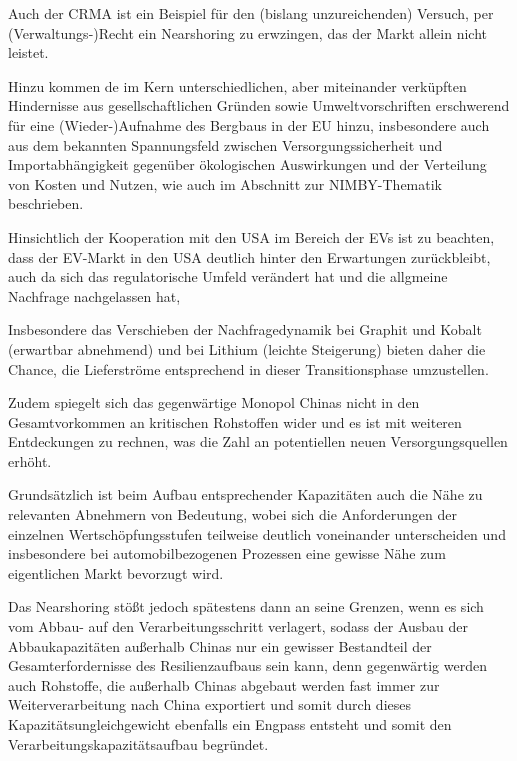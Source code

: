 \documentclass[12pt,a4paper,oneside]{book} %
\begin{document}
 Auch der CRMA ist ein Beispiel für den (bislang unzureichenden) Versuch, per (Verwaltungs-)Recht ein Nearshoring zu erwzingen, das der Markt allein nicht leistet.
 
 Hinzu kommen de im Kern unterschiedlichen, aber miteinander verküpften Hindernisse aus gesellschaftlichen Gründen sowie Umweltvorschriften erschwerend für eine (Wieder-)Aufnahme des Bergbaus in der EU hinzu, insbesondere auch aus dem bekannten Spannungsfeld zwischen Versorgungssicherheit und Importabhängigkeit gegenüber ökologischen Auswirkungen und der Verteilung von Kosten und Nutzen,\autocite{PE 786.415} wie auch im Abschnitt zur NIMBY-Thematik beschrieben.
 
 Hinsichtlich der Kooperation mit den USA im Bereich der EVs ist zu beachten, dass der EV-Markt in den USA deutlich hinter den Erwartungen zurückbleibt, auch da sich das regulatorische Umfeld verändert hat und die allgmeine Nachfrage nachgelassen hat,\autocite{https://www.wsj.com/business/autos/detroit-automakers-take-50-billion-hit-as-ev-bubble-bursts-06a97414}
 
 Insbesondere das Verschieben der Nachfragedynamik bei Graphit und Kobalt (erwartbar abnehmend) und bei Lithium (leichte Steigerung) bieten daher die Chance, die Lieferströme entsprechend in dieser Transitionsphase umzustellen.\autocite{McBridge, S. 25}
 
 Zudem spiegelt sich das gegenwärtige Monopol Chinas nicht in den Gesamtvorkommen an kritischen Rohstoffen wider und es ist mit weiteren Entdeckungen zu rechnen, was die Zahl an potentiellen neuen Versorgungsquellen erhöht.\autocite{https://www.goldmansachs.com/insights/articles/resource-realism-the-geopolitics-of-critical-mineral-supply-chains}
 
 Grundsätzlich ist beim Aufbau entsprechender Kapazitäten auch die Nähe zu relevanten Abnehmern von Bedeutung, wobei sich die Anforderungen der einzelnen Wertschöpfungsstufen teilweise deutlich voneinander unterscheiden und insbesondere bei automobilbezogenen Prozessen eine gewisse Nähe zum eigentlichen Markt bevorzugt wird.\autocite{KAS: Vom Dialog zur Lieferkette, S. 32}
 
 Das Nearshoring stößt jedoch spätestens dann an seine Grenzen, wenn es sich vom Abbau- auf den Verarbeitungsschritt verlagert, sodass der Ausbau der Abbaukapazitäten außerhalb Chinas nur ein gewisser Bestandteil der Gesamterfordernisse des Resilienzaufbaus sein kann, denn gegenwärtig werden auch Rohstoffe, die außerhalb Chinas abgebaut werden fast immer zur Weiterverarbeitung nach China exportiert und somit durch dieses Kapazitätsungleichgewicht ebenfalls ein Engpass entsteht und somit den Verarbeitungskapazitätsaufbau begründet.\autocite{https://www.goldmansachs.com/insights/articles/resource-realism-the-geopolitics-of-critical-mineral-supply-chains}
\end{document}
